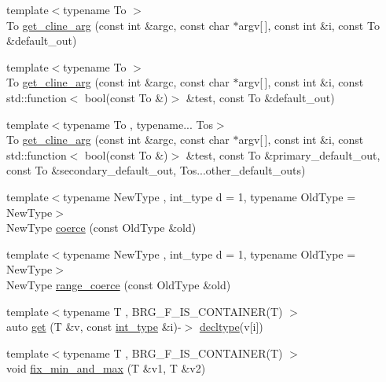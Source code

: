 \begin{DoxyCompactItemize}
\item 
{\footnotesize template$<$typename To $>$ }\\To \hyperlink{namespaceIceBRG_ad6e7875dca5d5dd7b6be7bec2f14bb04}{get\-\_\-cline\-\_\-arg} (const int \&argc, const char $\ast$argv\mbox{[}$\,$\mbox{]}, const int \&i, const To \&default\-\_\-out)
\item 
{\footnotesize template$<$typename To $>$ }\\To \hyperlink{namespaceIceBRG_ad87dd6b92237fba5a42dbeacac9fffc0}{get\-\_\-cline\-\_\-arg} (const int \&argc, const char $\ast$argv\mbox{[}$\,$\mbox{]}, const int \&i, const std\-::function$<$ bool(const To \&)$>$ \&test, const To \&default\-\_\-out)
\item 
{\footnotesize template$<$typename To , typename... Tos$>$ }\\To \hyperlink{namespaceIceBRG_a429b26c37fb4c307de54593208a1613f}{get\-\_\-cline\-\_\-arg} (const int \&argc, const char $\ast$argv\mbox{[}$\,$\mbox{]}, const int \&i, const std\-::function$<$ bool(const To \&)$>$ \&test, const To \&primary\-\_\-default\-\_\-out, const To \&secondary\-\_\-default\-\_\-out, Tos...\-other\-\_\-default\-\_\-outs)
\item 
{\footnotesize template$<$typename New\-Type , int\-\_\-type d = 1, typename Old\-Type  = New\-Type$>$ }\\New\-Type \hyperlink{namespaceIceBRG_a75bea19938f98230645198228e8b11f7}{coerce} (const Old\-Type \&old)
\item 
{\footnotesize template$<$typename New\-Type , int\-\_\-type d = 1, typename Old\-Type  = New\-Type$>$ }\\New\-Type \hyperlink{namespaceIceBRG_a1cb0b56c6ec1f1c1398efc974ef0bd37}{range\-\_\-coerce} (const Old\-Type \&old)
\item 
{\footnotesize template$<$typename T , B\-R\-G\-\_\-\-F\-\_\-\-I\-S\-\_\-\-C\-O\-N\-T\-A\-I\-N\-E\-R(\-T) $>$ }\\auto \hyperlink{namespaceIceBRG_a8dab53a7f9a46c62f6760c21ccfe1f66}{get} (T \&v, const \hyperlink{lib_2IceBRG__main_2common_8h_ac4de9d9335536ac22821171deec8d39e}{int\-\_\-type} \&i)-\/$>$ \hyperlink{namespaceIceBRG_a528e5024ecab03049320529180ae84a8}{decltype}(v\mbox{[}i\mbox{]})
\item 
{\footnotesize template$<$typename T , B\-R\-G\-\_\-\-F\-\_\-\-I\-S\-\_\-\-C\-O\-N\-T\-A\-I\-N\-E\-R(\-T) $>$ }\\void \hyperlink{namespaceIceBRG_a6a80d91835add9f6719b9233a19cdea5}{fix\-\_\-min\-\_\-and\-\_\-max} (T \&v1, T \&v2)

\end{DoxyCompactItemize}
